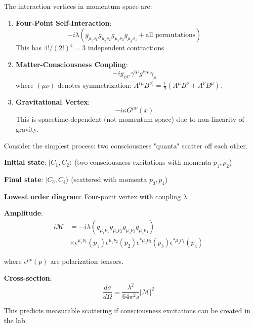 \begin{thm}\label{thm:feynman-rules}
The interaction vertices in momentum space are:

\begin{enumerate}
\item \textbf{Four-Point Self-Interaction}:
\begin{equation}
-i\lambda (g_{\mu_1\nu_1}g_{\mu_2\nu_2}g_{\mu_3\nu_3}g_{\mu_4\nu_4} + \text{all permutations})
\end{equation}
This has $4!/(2!)^4 = 3$ independent contractions.

\item \textbf{Matter-Consciousness Coupling}:
\begin{equation}
-ig_{\psi C}\gamma^{(\mu}g^{\nu)\rho}\gamma_\rho
\end{equation}
where $(\mu \nu)$ denotes symmetrization: $A^{(\mu}B^{\nu)} = \frac{1}{2}(A^\mu B^\nu + A^\nu B^\mu)$.

\item \textbf{Gravitational Vertex}:
\begin{equation}
-i\kappa G^{\mu\nu}(x)
\end{equation}
This is spacetime-dependent (not momentum space) due to non-linearity of gravity.
\end{enumerate}
\end{thm}

\begin{level2}
Consider the simplest process: two consciousness "quanta" scatter off each other.

\textbf{Initial state}: $|C_1, C_2\rangle$ (two consciousness excitations with momenta $p_1, p_2$)

\textbf{Final state}: $|C_3, C_4\rangle$ (scattered with momenta $p_3, p_4$)

\textbf{Lowest order diagram}: Four-point vertex with coupling $\lambda$

\textbf{Amplitude}:
\begin{align}
i\mathcal{M} &= -i\lambda (g_{\mu_1\nu_1}g_{\mu_2\nu_2}g_{\mu_3\nu_3}g_{\mu_4\nu_4}) \\
&\times \epsilon^{\mu_1\nu_1}(p_1) \epsilon^{\mu_2\nu_2}(p_2) \epsilon^{*\mu_3\nu_3}(p_3) \epsilon^{*\mu_4\nu_4}(p_4)
\end{align}

where $\epsilon^{\mu\nu}(p)$ are polarization tensors.

\textbf{Cross-section}:
\begin{equation}
\frac{d\sigma}{d\Omega} = \frac{\lambda^2}{64\pi^2 s} |\mathcal{M}|^2
\end{equation}

This predicts measurable scattering if consciousness excitations can be created in the lab.
\end{level2}

